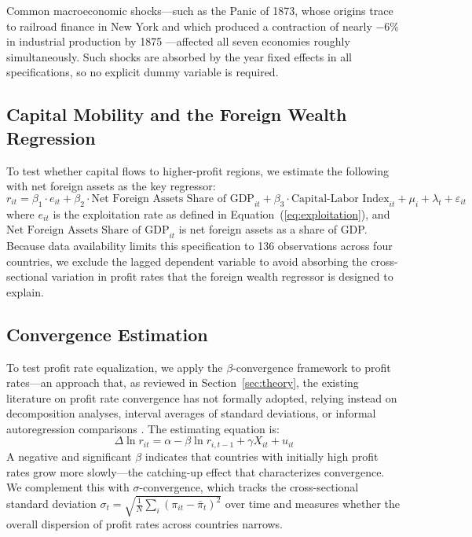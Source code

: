 \documentclass[10pt]{article}
\begin{document}
\par Common macroeconomic shocks---such as the Panic of 1873, whose origins trace to railroad finance in New York and which produced a contraction of nearly $-6\%$ in industrial production by 1875 \citep{Wicker2006, Hilt2018}---affected all seven economies roughly simultaneously. Such shocks are absorbed by the year fixed effects in all specifications, so no explicit dummy variable is required.

\subsection{Capital Mobility and the Foreign Wealth Regression}

To test whether capital flows to higher-profit regions, we estimate the following with net foreign assets as the key regressor:
\begin{equation}
    r_{it} = \beta_1 \cdot e_{it} + \beta_2 \cdot \text{Net Foreign Assets Share of GDP}_{it} + \beta_3 \cdot \text{Capital-Labor Index}_{it} + \mu_i + \lambda_t + \varepsilon_{it}
\label{eq:foreign_wealth}
\end{equation}
where $e_{it}$ is the exploitation rate as defined in Equation~(\ref{eq:exploitation}), and $\text{Net Foreign Assets Share of GDP}_{it}$ is net foreign assets as a share of GDP. Because data availability limits this specification to 136 observations across four countries, we exclude the lagged dependent variable to avoid absorbing the cross-sectional variation in profit rates that the foreign wealth regressor is designed to explain.

\subsection{Convergence Estimation}

To test profit rate equalization, we apply the \citet{BarroSalaIMartin1997} $\beta$-convergence framework to profit rates---an approach that, as reviewed in Section~\ref{sec:theory}, the existing literature on profit rate convergence has not formally adopted, relying instead on decomposition analyses, interval averages of standard deviations, or informal autoregression comparisons \citep{LuginbuhlKoopman2004, PhillipsSul2007}. The estimating equation is:
\begin{equation}
\Delta \ln r_{it} = \alpha - \beta \ln r_{i,t-1} + \gamma X_{it} + u_{it}
\end{equation}
A negative and significant $\beta$ indicates that countries with initially high profit rates grow more slowly---the catching-up effect that characterizes convergence. We complement this with $\sigma$-convergence, which tracks the cross-sectional standard deviation $\sigma_t = \sqrt{\frac{1}{N}\sum_i(\pi_{it} - \bar{\pi}_t)^2}$ over time and measures whether the overall dispersion of profit rates across countries narrows.
\end{document}
